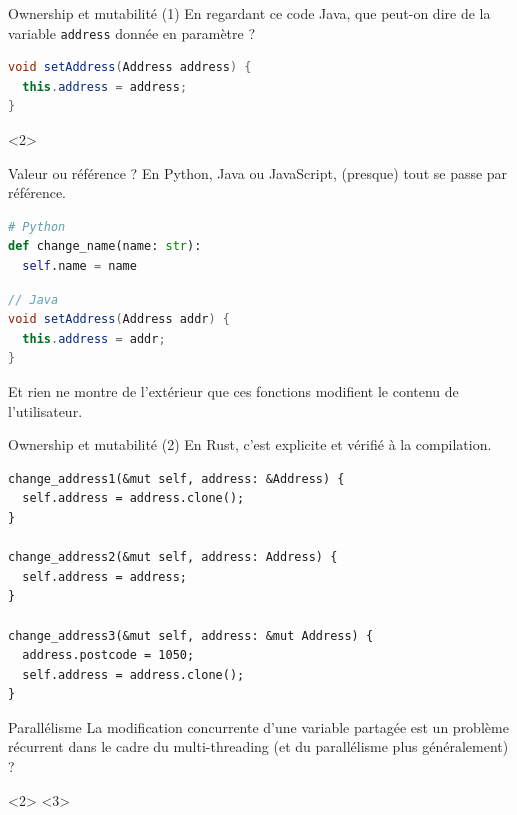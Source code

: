 \documentclass[usenames,dvipsnames]{beamer}
\begin{document}
\begin{frame}[fragile]{Ownership et mutabilité (1)}
	En regardant ce code Java, que peut-on dire de la variable \texttt{address} donnée en paramètre ?
\begin{lstlisting}[language=Java]
void setAddress(Address address) {
  this.address = address;
}	
\end{lstlisting}
\end{frame}

\begin{frame}[fragile]{Valeur ou référence ?}
	En Python, Java ou JavaScript, (presque) tout se passe par référence.
	
	\begin{lstlisting}[language=Python]
# Python
def change_name(name: str):
  self.name = name
	\end{lstlisting}
	\begin{lstlisting}[language=Java]
// Java
void setAddress(Address addr) {
  this.address = addr;
}	
\end{lstlisting}
	Et rien ne montre de l'extérieur que ces fonctions modifient le contenu de l'utilisateur.	
\end{frame}


\begin{frame}[fragile]{Ownership et mutabilité (2)}
	En Rust, c'est explicite et vérifié à la compilation.
	
	\begin{lstlisting}
change_address1(&mut self, address: &Address) {
  self.address = address.clone();
}

change_address2(&mut self, address: Address) {
  self.address = address;
}

change_address3(&mut self, address: &mut Address) {
  address.postcode = 1050;
  self.address = address.clone();
}
	\end{lstlisting}
\end{frame}

\begin{frame}{Parallélisme}
	La modification concurrente d'une variable partagée est un problème récurrent dans le cadre du multi-threading (et du parallélisme plus généralement) ?
	
\end{frame}
\end{document}
